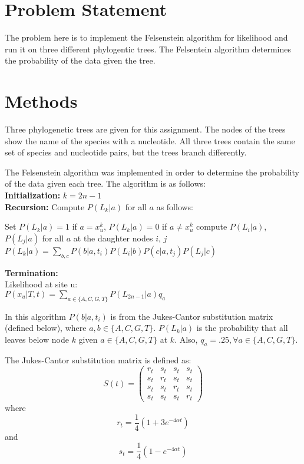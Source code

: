 \documentclass{acm_proc_article-sp}
\begin{document}
\section{Problem Statement}
The problem here is to implement the Felsenstein algorithm for likelihood and run it on three different phylogentic trees.  The Felsentein algorithm determines the probability of the data given the tree.  


\section{Methods}
Three phylogenetic trees are given for this assignment.  The nodes of the trees show the name of the species with a nucleotide.  All three trees contain the same set of species and nucleotide pairs, but the trees branch differently.  

The Felsenstein algorithm was implemented in order to determine the probability of the data given each tree.  The algorithm is as follows:  \\
\textbf{Initialization:} $k = 2n - 1$ \\
\textbf{Recursion:} Compute $P(L_k | a)$ for all $a$ as follows: 
\begin{algorithmic}
\State Set $P(L_k | a) = 1$ if $a = x_u^k$, $P(L_k | a) = 0$ if $ a \neq x_u^k$
\Else
\State compute $P(L_i | a)$, $P(L_j | a)$ for all $a$ at the daughter nodes $i$, $j$
\State $P(L_k | a) = \sum_{b,c} P(b|a, t_i)P(L_i|b)P(c|a,t_j)P(L_j|c)$
\EndIf
\end{algorithmic}
\textbf{Termination:} \\
Likelihood at site u: \\ 
$P(x_u | T,t) = \sum\limits_{a\in \{A,C,G,T\}} P(L_{2n-1} | a)q_a$

In this algorithm $P(b|a, t_i)$ is from the Jukes-Cantor substitution matrix (defined below), where $a,b \in \{A,C,G,T\}$.  $P(L_k | a)$ is the probability that all leaves below node $k$ given $a \in \{A,C,G,T\}$ at $k$. Also, $q_a = .25, \forall a \in \{A,C,G,T\}$.

The Jukes-Cantor substitution matrix is defined as:
 \[ S(t) = \left( \begin{array}{cccc}
r_t & s_t & s_t & s_t \\
s_t & r_t & s_t & s_t \\
s_t & s_t & r_t & s_t \\
s_t & s_t & s_t & r_t \end{array} \right)\]
where 
\begin{equation} r_t = \frac{1}{4}(1+3e^{-4\alpha t})\end{equation}
and
\begin{equation} s_t = \frac{1}{4}(1-e^{-4\alpha t})\end{equation}
\end{document}
